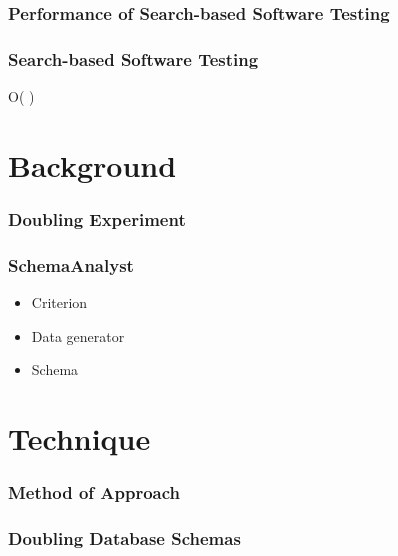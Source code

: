 \documentclass[hyperref]{beamer}
\begin{document}
\begin{frame}
  \frametitle{Performance of Search-based Software Testing}
   
   
\end{frame}

\begin{frame}
    \frametitle{Search-based Software Testing}
    \HUGE O( )
\end{frame}




  \section{Background}

    \begin{frame}
      \frametitle{Doubling Experiment}
    \end{frame}

    \begin{frame}
      \frametitle{SchemaAnalyst}
      \begin{itemize}
        \item Criterion
        \item Data generator
        \item Schema
      \end{itemize}
    \end{frame}

    \section{Technique}
      \begin{frame}
          \frametitle{Method of Approach}
          \centering
          
          
      \end{frame}

      \begin{frame}
        \frametitle{Doubling Database Schemas}
        \centering
        
        
      \end{frame}
\end{document}
